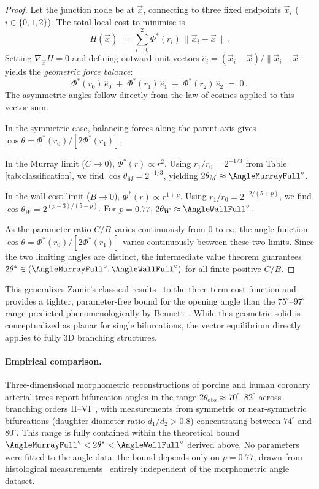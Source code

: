 \documentclass[11pt,a4paper]{article}
\theoremstyle{remark}
\begin{document}
\begin{proof}
Let the junction node be at $\vec{x}$, connecting to three fixed endpoints
$\vec{x}_i$ ($i\in\{0,1,2\}$). The total local cost to minimise is
\[
  H(\vec{x}) \;=\; \sum_{i=0}^{2} \Phi^*(r_i)\,\|\vec{x}_i - \vec{x}\|\,.
\]
Setting $\nabla_{\vec{x}} H = 0$ and defining outward unit vectors
$\hat{e}_i = (\vec{x}_i - \vec{x})/\|\vec{x}_i - \vec{x}\|$
yields the \emph{geometric force balance}:
\[
  \Phi^*(r_0)\,\hat{e}_0 \;+\; \Phi^*(r_1)\,\hat{e}_1 \;+\;
  \Phi^*(r_2)\,\hat{e}_2 \;=\; 0\,.
\]
The asymmetric angles follow directly from the law of cosines applied to
this vector sum.

In the symmetric case, balancing forces along the parent axis gives $\cos\theta
= \Phi^*(r_0)/[2\Phi^*(r_1)]$.

In the Murray limit ($C\to0$), $\Phi^*(r) \propto r^2$. Using $r_1/r_0 =
2^{-1/3}$ from Table \ref{tab:classification}, we find $\cos\theta_M =
2^{-1/3}$, yielding $2\theta_M \approx \AngleMurrayFull^\circ$.

In the wall-cost limit ($B\to0$), $\Phi^*(r) \propto r^{1+p}$. Using $r_1/r_0 =
2^{-2/(5+p)}$, we find $\cos\theta_W = 2^{(p-3)/(5+p)}$. For $p=0.77$,
$2\theta_W \approx \AngleWallFull^\circ$.

As the parameter ratio $C/B$ varies continuously from $0$ to $\infty$, the angle
function $\cos\theta = \Phi^*(r_0)/[2\Phi^*(r_1)]$ varies continuously between
these two limits. Since the two limiting angles are distinct, the intermediate
value theorem guarantees
$2\theta^*\in(\AngleMurrayFull^\circ,\AngleWallFull^\circ)$ for all finite
positive $C/B$.
\end{proof}

This generalizes Zamir's classical results~\cite{Zamir1978} to the three-term
cost function and provides a tighter, parameter-free bound for the opening angle
than the $75^\circ$--$97^\circ$ range predicted phenomenologically by
Bennett~\cite{bennett2025}. While this geometric solid is conceptualized as
planar for single bifurcations, the vector equilibrium directly applies to fully
3D branching structures.

\paragraph{Empirical comparison.} Three-dimensional morphometric reconstructions
of porcine and human coronary arterial trees report bifurcation angles in the
range $2\theta_{\mathrm{obs}} \approx 70^\circ$--$82^\circ$ across branching
orders II--VI~\cite{Zamir1982,Kaimovitz2005}, with measurements from symmetric
or near-symmetric bifurcations (daughter diameter ratio $d_1/d_2 > 0.8$)
concentrating between $74^\circ$ and $80^\circ$. This range is fully contained
within the theoretical bound $\AngleMurrayFull^\circ < 2\theta^* <
\AngleWallFull^\circ$ derived above. No parameters were fitted to the angle
data: the bound depends only on $p = 0.77$, drawn from histological
measurements~\cite{Nichols2011,WolinskyGlagov1967} entirely independent of the
morphometric angle dataset.
\end{document}
